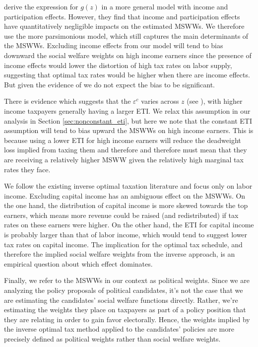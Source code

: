 \documentclass[12pt]{article}
\begin{document}
\citet{JJZ2017} derive the expression for $g(z)$ in a more general model with income and participation effects.  However, they find that income and participation effects have quantitatively negligible impacts on the estimated MSWWs. We therefore use the more parsimonious model, which still captures the main determinants of the MSWWs.  Excluding income effects from our model will tend to bias downward the social welfare weights on high income earners since the presence of income effects would lower the distortion of high tax rates on labor supply, suggesting that optimal tax rates would be higher when there are income effects.  But given the evidence of \citet{JJZ2017} we do not expect the bias to be significant.

There is evidence which suggests that the $\varepsilon^c$ varies across $z$ (see \citet{SSG2012}), with higher income taxpayers generally having a larger ETI. We relax this assumption in our analysis in Section \ref{sec:nonconstant_eti}, but here we note that the constant ETI assumption will tend to bias upward the MSWWs on high income earners.  This is because using a lower ETI for high income earners will reduce the deadweight loss implied from taxing them and therefore and therefore must mean that they are receiving a relatively higher MSWW given the relatively high marginal tax rates they face.

We follow the existing inverse optimal taxation literature and focus only on labor income.  Excluding capital income has an ambiguous effect on the MSWWs.  On the one hand, the distribution of capital income is more skewed towards the top earners, which means more revenue could be raised (and redistributed) if tax rates on these earners were higher.  On the other hand, the ETI for capital income is probably larger than that of labor income, which would tend to suggest lower tax rates on capital income. The implication for the optimal tax schedule, and therefore the implied social welfare weights from the inverse approach, is an empirical question about which effect dominates.

Finally, we refer to the MSWWs in our context as political weights.  Since we are analyzing the policy proposals of political candidates, it's not the case that we are estimating the candidates' social welfare functions directly.  Rather, we're estimating the weights they place on taxpayers as part of a policy position that they are relating in order to gain favor electorally. Hence, the weights implied by the inverse optimal tax method applied to the candidates' policies are more precisely defined as political weights rather than social welfare weights.
\end{document}
